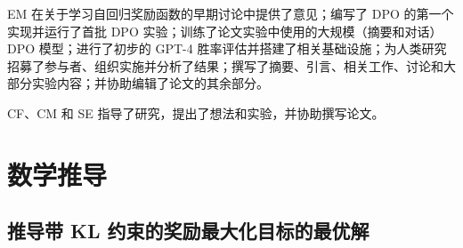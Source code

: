 \documentclass[11pt,UTF8,fontset=fandol]{ctexart}
\begin{document}
EM 在关于学习自回归奖励函数的早期讨论中提供了意见；编写了 DPO 的第一个实现并运行了首批 DPO 实验；训练了论文实验中使用的大规模（摘要和对话）DPO 模型；进行了初步的 GPT-4 胜率评估并搭建了相关基础设施；为人类研究招募了参与者、组织实施并分析了结果；撰写了摘要、引言、相关工作、讨论和大部分实验内容；并协助编辑了论文的其余部分。

CF、CM 和 SE 指导了研究，提出了想法和实验，并协助撰写论文。

\appendix

\section{数学推导}

\subsection{推导带 KL 约束的奖励最大化目标的最优解}
\end{document}
